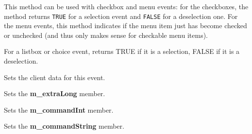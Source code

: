 \label{wxcommandeventischecked}


This method can be used with checkbox and menu events: for the checkboxes, the
method returns {\tt TRUE} for a selection event and {\tt FALSE} for a
deselection one. For the menu events, this method indicates if the menu item
just has become checked or unchecked (and thus only makes sense for checkable
menu items).



For a listbox or choice event, returns TRUE if it is a selection, FALSE if it
is a deselection.



Sets the client data for this event.



Sets the {\bf m\_extraLong} member.



Sets the {\bf m\_commandInt} member.



Sets the {\bf m\_commandString} member.

